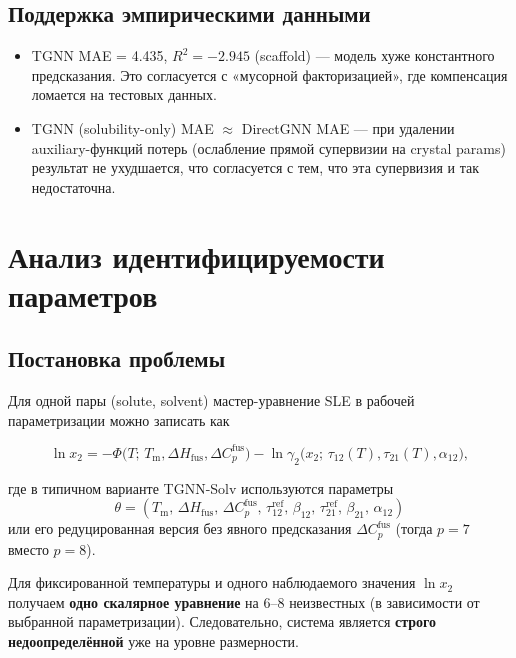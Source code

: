 \documentclass[11pt]{article}
\begin{document}
\subsection{Поддержка эмпирическими данными}

\begin{itemize}
  \item TGNN MAE = 4.435, $R^2 = -2.945$ (scaffold) --- модель хуже константного предсказания. Это согласуется с «мусорной факторизацией», где компенсация ломается на тестовых данных.
  \item TGNN (solubility-only) MAE $\approx$ DirectGNN MAE --- при удалении auxiliary-функций потерь (ослабление прямой супервизии на crystal params) результат не ухудшается, что согласуется с тем, что эта супервизия и так недостаточна.
\end{itemize}

\section{Анализ идентифицируемости параметров}
\label{sec:identifiability}

\subsection{Постановка проблемы}

Для одной пары (solute, solvent) мастер-уравнение SLE в рабочей параметризации можно записать как

\begin{equation*}
\ln x_2 = -\Phi\!\bigl(T;\, T_{\mathrm{m}}, \Delta H_{\mathrm{fus}}, \Delta C_p^{\mathrm{fus}}\bigr) - \ln\gamma_2\!\bigl(x_2;\, \tau_{12}(T), \tau_{21}(T), \alpha_{12}\bigr),
\end{equation*}

где в типичном варианте TGNN-Solv используются параметры
\begin{equation*}
\theta = \left(T_{\mathrm{m}},\, \Delta H_{\mathrm{fus}},\, \Delta C_p^{\mathrm{fus}},\, \tau_{12}^{\mathrm{ref}},\, \beta_{12},\, \tau_{21}^{\mathrm{ref}},\, \beta_{21},\, \alpha_{12}\right)
\end{equation*}
или его редуцированная версия без явного предсказания $\Delta C_p^{\mathrm{fus}}$ (тогда $p=7$ вместо $p=8$).

Для фиксированной температуры и одного наблюдаемого значения $\ln x_2$ получаем \textbf{одно скалярное уравнение} на 6--8 неизвестных (в зависимости от выбранной параметризации). Следовательно, система является \textbf{строго недоопределённой} уже на уровне размерности.
\end{document}
